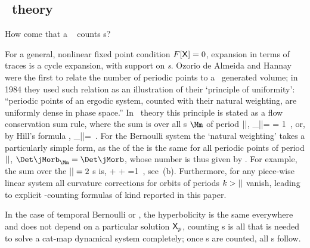 
\subsection{\Po\ theory}
\label{s:PoThe}

How come that a \HillDet\  counts {\lattstate}s?

For a general, nonlinear fixed point condition $F[\mathsf{X}]=0$, expansion
 in terms of traces is a cycle
expansion, with support on \emph{{\po}s}.
Ozorio de Almeida and Hannay were the first to relate the
number of periodic points to a \JacobianM\ generated volume; in 1984 they
used such relation as an illustration of their `principle of uniformity':
``periodic points of an ergodic system, counted with their natural
weighting, are uniformly dense in phase space.'' In \po\
theory this principle is stated as a
 {flow
conservation} sum rule, where the sum is over all {\lattstate}s $\Mm$ of
period ${||}$,
\beq
\sum_{|\Mm|=\cl{}}
    \;= 1
\,,
\label{H-OdeA_mapsOrb}
\eeq
or, by Hill's formula ,
\beq
\sum_{|\Mm|=\cl{}}
\,.
\label{Det(jMorb)eights}
\eeq
For the Bernoulli system the `natural weighting' takes a particularly
simple form, as the {\HillDet} of the {\jacobianOrb} is the same for all
periodic points of period ${||}$, $\Det\jMorb_\Mm=\Det\jMorb$, whose
number is thus given by \refeq{LC21detBern}.
For example, the sum over the ${||}=2$ {\lattstate}s is,
\beq
   +    
   + 
    =1
\,,
see \,(b).
Furthermore, for any piece-wise
linear system all curvature corrections for orbits of
periods $k>{||}$ vanish, leading to explicit {\lattstate}-counting
formulas of kind reported in this paper.

In the case of temporal Bernoulli or \templatt, the hyperbolicity is the same
everywhere and does not depend on a particular solution $\mathsf{X}_p$, counting
\po s is all that is needed to solve a cat-map dynamical system
completely; once \po s are counted, all {\cycForm s}\rf{CBtrace} follow.

